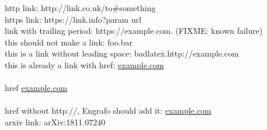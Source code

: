 \documentclass{article}
\begin{document}
  http link: http://link.co.uk/to\#something \\
  https link: https://link.info?param url \\
  link with trailing period: https://example.com. (FIXME: known failure) \\
  this should not make a link: foo.bar \\
  this is a link without leading space: badlatex.http://example.com \\
  this is already a link with href: \href{http://example.com}{example.com} \\
  \\href \href{http://example.com}{example.com} \\
  \\href without http://, Engrafo should add it: \href{example.com}{example.com} \\
  arxiv link: arXiv:1811.07240 \\
\end{document}
